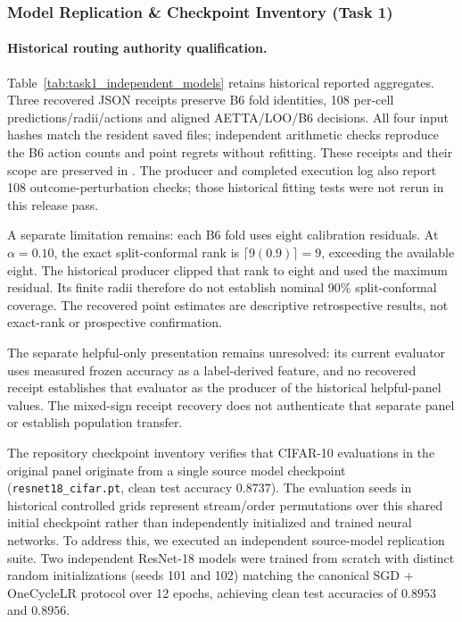 




\subsubsection{Model Replication \& Checkpoint Inventory (Task 1)}
\label{app:model-replication}

\paragraph{Historical routing authority qualification.}
\label{app:replication-provenance}
Table~\ref{tab:task1_independent_models} retains historical reported aggregates. Three recovered JSON receipts preserve B6 fold identities, 108 per-cell predictions/radii/actions and aligned AETTA/LOO/B6 decisions. All four input hashes match the resident saved files; independent arithmetic checks reproduce the B6 action counts and point regrets without refitting. These receipts and their scope are preserved in . The producer and completed execution log also report 108 outcome-perturbation checks; those historical fitting tests were not rerun in this release pass.

A separate limitation remains: each B6 fold uses eight calibration residuals. At $\alpha=0.10$, the exact split-conformal rank is $\lceil9(0.9)\rceil=9$, exceeding the available eight. The historical producer clipped that rank to eight and used the maximum residual. Its finite radii therefore do not establish nominal 90\% split-conformal coverage. The recovered point estimates are descriptive retrospective results, not exact-rank or prospective confirmation.

The separate helpful-only presentation remains unresolved: its current evaluator uses measured frozen accuracy as a label-derived feature, and no recovered receipt establishes that evaluator as the producer of the historical helpful-panel values. The mixed-sign receipt recovery does not authenticate that separate panel or establish population transfer.

The repository checkpoint inventory verifies that CIFAR-10 evaluations in the original panel originate from a single source model checkpoint (\texttt{resnet18\_cifar.pt}, clean test accuracy $0.8737$). The evaluation seeds in historical controlled grids represent stream/order permutations over this shared initial checkpoint rather than independently initialized and trained neural networks. To address this, we executed an independent source-model replication suite. Two independent ResNet-18 models were trained from scratch with distinct random initializations (seeds 101 and 102) matching the canonical SGD + OneCycleLR protocol over 12 epochs, achieving clean test accuracies of $0.8953$ and $0.8956$. 

